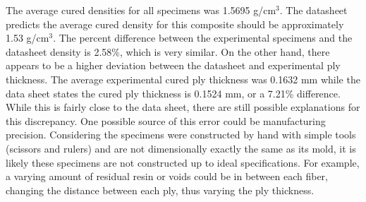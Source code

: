 The average cured densities for all specimens was 1.5695 g/cm$^{3}$. The datasheet predicts the average cured density for this composite should be approximately 1.53 g/cm$^{3}$. The percent difference between the experimental specimens and the datasheet density is 2.58\%, which is very similar. On the other hand, there appears to be a higher deviation between the datasheet and experimental ply thickness. The average experimental cured ply thickness was 0.1632 mm while the data sheet states the cured ply thickness is 0.1524 mm, or a 7.21\% difference. While this is fairly close to the data sheet, there are still possible explanations for this discrepancy. One possible source of this error could be manufacturing precision. Considering the specimens were constructed by hand with simple tools (scissors and rulers) and are not dimensionally exactly the same as its mold, it is likely these specimens are not constructed up to ideal specifications. For example, a varying amount of residual resin or voids could be in between each fiber, changing the distance between each ply, thus varying the ply thickness.   
